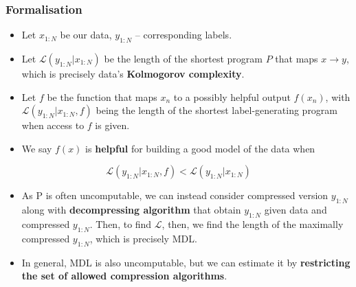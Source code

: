 \documentclass[10pt]{beamer}
\begin{document}
\begin{frame}
\frametitle{Formalisation}
\begin{itemize}
  \item Let $x_{1:N}$ be our data, $y_{1:N}$ -- corresponding labels.

  \item Let $\mathcal{L}(y_{1:N} | x_{1:N})$ be the length of the shortest program $P$ that maps $x \rightarrow y$, which is precisely data's \textbf{Kolmogorov complexity}.

  \item Let $f$ be the function that maps $x_n$ to a possibly helpful output $f (x_n)$, with $\mathcal{L}(y_{1:N} |x_{1:N},f)$ being the length of the shortest label-generating program when access to $f$ is given.
  \item We say $f(x)$ is \textbf{helpful} for building a good model of the data when
\end{itemize}
$$\mathcal{L}(y_{1:N} |x_{1:N},f) < \mathcal{L}(y_{1:N} | x_{1:N})$$

\begin{itemize}
  \item As P is often uncomputable, we can instead consider compressed version  $y_{1:N}$ along with \textbf{decompressing algorithm} that obtain $y_{1:N}$  given data and compressed  $y_{1:N}$. Then, to find $\mathcal{L}$, then, we find the length of the maximally compressed $y_{1:N}$, which is precisely MDL.
  \item In general, MDL is also uncomputable, but we can estimate it by \textbf{restricting the set of allowed compression algorithms}.
\end{itemize}

\end{frame}
\end{document}
